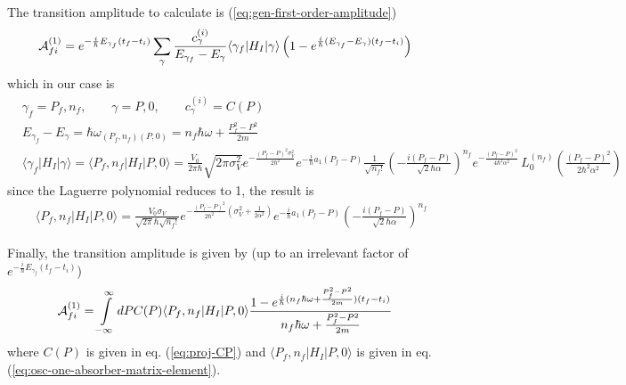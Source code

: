 The transition amplitude to calculate is (\ref{eq:gen-first-order-amplitude})
\begin{align}
  {\cal A}_{fi}^{(1)} & =e^{-\frac{i}{\hbar}E_{\gamma_f}(t_f-t_i)}\sum_\gamma \frac{c_\gamma^{(i)}}{{E_{\gamma_f}- E_\gamma}} \langle \gamma_f|H_I|\gamma\rangle  \left(1-e^{\frac{i}{\hbar}({E_{\gamma_f}- E_\gamma})(t_f-t_i)} \right)
\end{align}
which in our case is
\begin{align}
   & \gamma_f = {P_f, n_f},\qquad \gamma = {P, 0},\qquad c_\gamma^{(i)} = C(P)\nonumber                                                                                                                                                                                                                                                                                                                       \\
   & E_{\gamma_f}- E_\gamma = \hbar\omega_{(P_f,n_f) (P,0)} = {n_f\hbar\omega+ \frac{P_f^2-P^2}{2m}}                                                                                                                                                                                                                                                                                                          \\
   & \langle \gamma_f|H_I|\gamma\rangle = \langle P_f,n_f |H_I|P,0\rangle = \frac{V_0}{2\pi\hbar}\sqrt{2\pi \sigma_V^2 }e^{-\frac{\left(P_f-P\right)^2 \sigma_V^2 }{2\hbar ^2}}e^{-\frac{i}{\hbar}a_1(P_f-P)}{\frac{1}{\sqrt{n_f!}}}\left(-\frac{i (P_f-P) }{\sqrt{2}\hbar\alpha }\right)^{n_f} e^{-\frac{(P_f-P)^2 }{4\hbar^2\alpha ^2}} \, L_{0}^{(n_f)}\!\left(\frac{(P_f-P)^2 }{2\hbar^2\alpha ^2}\right)
\end{align}
since the Laguerre polynomial reduces to 1, the  result is
\begin{align}
  \langle P_f,n_f |H_I|P,0\rangle = \frac{V_0\sigma_V}{\sqrt{2\pi}\hbar {\sqrt{n_f!}}}e^{-\frac{\left(P_f-P\right)^2 }{2\hbar ^2}(\sigma_V^2 +
      \frac{1}{2\alpha^2})}e^{-\frac{i}{\hbar}a_1(P_f-P)}\left(-\frac{i (P_f-P)  }{\sqrt{2}\hbar\alpha}\right)^{n_f}\label{eq:osc-one-absorber-matrix-element}
\end{align}

Finally, the transition amplitude is given by (up to an irrelevant factor of $e^{-\frac{i}{\hbar}E_{\gamma_f}(t_f-t_i)}$)
\begin{align}
  \label{eq:osc-one-absorber-amplitude}    {\cal A}_{fi}^{(1)} & =\int\limits_{-\infty}^{\infty}dP C(P) \langle P_f,n_f |H_I|P,0\rangle  \frac{1-e^{\frac{i}{\hbar}(n_f\hbar\omega+\frac{P_f^2-P^2}{2m})(t_f-t_i)}}{n_f\hbar\omega+\frac{P_f^2-P^2}{2m}}
\end{align}
where $C(P)$ is given in eq. (\ref{eq:proj-CP}) and $\langle P_f,n_f |H_I|P,0\rangle$ is given in eq. (\ref{eq:osc-one-absorber-matrix-element}).

